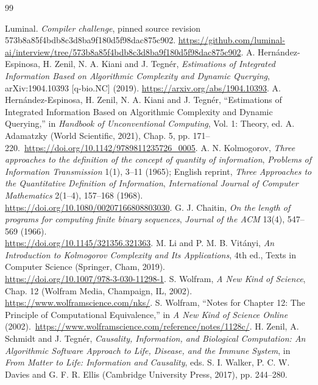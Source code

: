 \documentclass[11pt,a4paper]{article}
\begin{document}
\begin{thebibliography}{99}\raggedright\small
{} Luminal. \emph{Compiler challenge}, pinned source revision
573b8a85f4bdb8c3d8ba9f180d5f98dac875c902.
\url{https://github.com/luminal-ai/interview/tree/573b8a85f4bdb8c3d8ba9f180d5f98dac875c902}.
 A. Hernández-Espinosa, H. Zenil, N. A. Kiani and
J. Tegnér, \emph{Estimations of Integrated Information Based on Algorithmic
Complexity and Dynamic Querying}, arXiv:1904.10393 [q-bio.NC] (2019).
\url{https://arxiv.org/abs/1904.10393}.
 A. Hernández-Espinosa, H. Zenil, N. A. Kiani and
J. Tegnér, ``Estimations of Integrated Information Based on Algorithmic
Complexity and Dynamic Querying,'' in \emph{Handbook of Unconventional
Computing}, Vol. 1: Theory, ed. A. Adamatzky (World Scientific, 2021), Chap. 5,
pp. 171--220.\ \url{https://doi.org/10.1142/9789811235726_0005}.
 A. N. Kolmogorov, \emph{Three approaches to the
definition of the concept of quantity of information}, \emph{Problems of
Information Transmission} 1(1), 3--11 (1965); English reprint,
\emph{Three Approaches to the Quantitative Definition of Information},
\emph{International Journal of Computer Mathematics} 2(1--4), 157--168
(1968).\\ \url{https://doi.org/10.1080/00207166808803030}.
 G. J. Chaitin, \emph{On the length of programs for
computing finite binary sequences}, \emph{Journal of the ACM} 13(4),
547--569 (1966).\\ \url{https://doi.org/10.1145/321356.321363}.
 M. Li and P. M. B. Vitányi, \emph{An Introduction to
Kolmogorov Complexity and Its Applications}, 4th ed., Texts in Computer
Science (Springer, Cham, 2019).\\ \url{https://doi.org/10.1007/978-3-030-11298-1}.
 S. Wolfram, \emph{A New Kind of Science}, Chap. 12
(Wolfram Media, Champaign, IL, 2002).\\
\url{https://www.wolframscience.com/nks/}.
 S. Wolfram, ``Notes for Chapter 12: The Principle
of Computational Equivalence,'' in \emph{A New Kind of Science Online}
(2002).\ \url{https://www.wolframscience.com/reference/notes/1128c/}.
 H. Zenil, A. Schmidt and J. Tegnér,
\emph{Causality, Information, and Biological Computation: An Algorithmic
Software Approach to Life, Disease, and the Immune System}, in \emph{From
Matter to Life: Information and Causality}, eds. S. I. Walker, P. C. W. Davies
and G. F. R. Ellis (Cambridge University Press, 2017), pp. 244--280.

\end{thebibliography}
\end{document}
